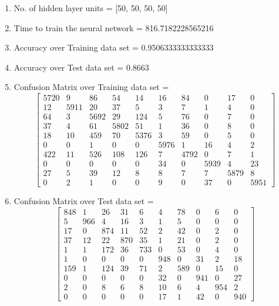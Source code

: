 \documentclass[11pt]{article}
\begin{document}
\hline
\begin{enumerate}
\item No. of hidden layer units = [50, 50, 50, 50]
\item Time to train the neural network = 816.7182228565216
\item Accuracy over Training data set = 0.9506333333333333
\item Accuracy over Test data set = 0.8663
\item Confusion Matrix over Training data set = 
\begin{equation}
  \begin{bmatrix}
5720 & 9 & 86 & 54 & 14 & 16 & 84 & 0 & 17 & 0\\
12 & 5911 & 20 & 37 & 5 & 3 & 7 & 1 & 4 & 0\\
64 & 3 & 5692 & 29 & 124 & 5 & 76 & 0 & 7 & 0\\
37 & 4 & 61 & 5802 & 51 & 1 & 36 & 0 & 8 & 0\\
18 & 10 & 459 & 70 & 5376 & 3 & 59 & 0 & 5 & 0\\
0 & 0 & 1 & 0 & 0 & 5976 & 1 & 16 & 4 & 2\\
422 & 11 & 526 & 108 & 126 & 7 & 4792 & 0 & 7 & 1\\
0 & 0 & 0 & 0 & 0 & 34 & 0 & 5939 & 4 & 23\\
27 & 5 & 39 & 12 & 8 & 8 & 7 & 7 & 5879 & 8\\
0 & 2 & 1 & 0 & 0 & 9 & 0 & 37 & 0 & 5951
  \end{bmatrix}
\end{equation}
\item Confusion Matrix over Test data set = 
\begin{equation}
  \begin{bmatrix}
848 & 1 & 26 & 31 & 6 & 4 & 78 & 0 & 6 & 0\\
5 & 966 & 4 & 16 & 3 & 1 & 5 & 0 & 0 & 0\\
17 & 0 & 874 & 11 & 52 & 2 & 42 & 0 & 2 & 0\\
37 & 12 & 22 & 870 & 35 & 1 & 21 & 0 & 2 & 0\\
1 & 1 & 172 & 36 & 733 & 0 & 53 & 0 & 4 & 0\\
1 & 0 & 0 & 0 & 0 & 948 & 0 & 31 & 2 & 18\\
159 & 1 & 124 & 39 & 71 & 2 & 589 & 0 & 15 & 0\\
0 & 0 & 0 & 0 & 0 & 32 & 0 & 941 & 0 & 27\\
2 & 0 & 8 & 6 & 8 & 10 & 6 & 4 & 954 & 2\\
0 & 0 & 0 & 0 & 0 & 17 & 1 & 42 & 0 & 940
  \end{bmatrix}
\end{equation}
\end{enumerate}
\end{document}
